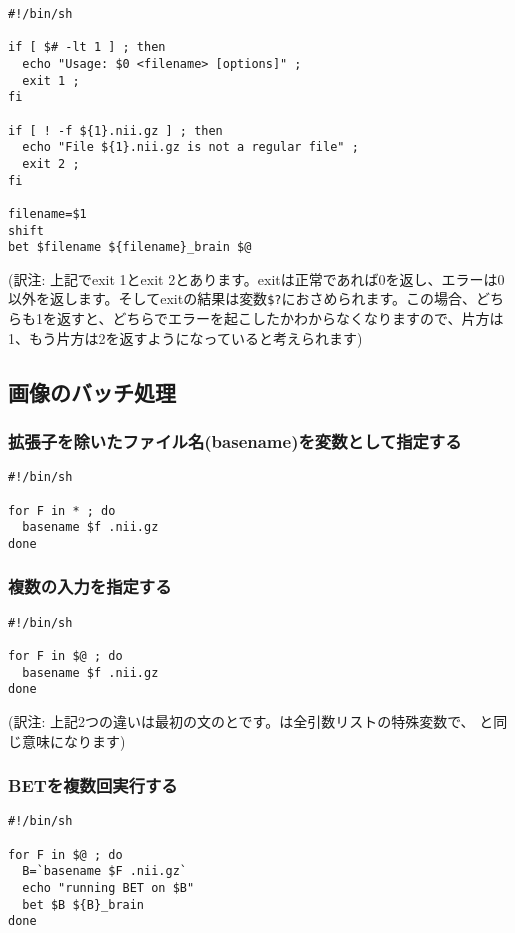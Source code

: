 \documentclass{jsarticle}
\begin{document}
\begin{verbatim}
#!/bin/sh

if [ $# -lt 1 ] ; then
  echo "Usage: $0 <filename> [options]" ;
  exit 1 ;
fi

if [ ! -f ${1}.nii.gz ] ; then
  echo "File ${1}.nii.gz is not a regular file" ;
  exit 2 ;
fi

filename=$1
shift
bet $filename ${filename}_brain $@
\end{verbatim}

\noindent (訳注: 上記でexit 1とexit 2とあります。exitは正常であれば0を返し、エラーは0以外を返します。そしてexitの結果は変数{\tt \$?}におさめられます。この場合、どちらも1を返すと、どちらでエラーを起こしたかわからなくなりますので、片方は1、もう片方は2を返すようになっていると考えられます)

\subsection{画像のバッチ処理}

\subsubsection{拡張子を除いたファイル名(basename)を変数として指定する}

\begin{verbatim}
#!/bin/sh

for F in * ; do
  basename $f .nii.gz
done
\end{verbatim}

\subsubsection{複数の入力を指定する}

\begin{verbatim}
#!/bin/sh

for F in $@ ; do
  basename $f .nii.gz
done
\end{verbatim}

\noindent (訳注: 上記2つの違いは最初の文の{\color{red}\Q{*}}と{\color{red}{\tt \$@}}です。{\color{red}{\tt \$@}}は全引数リストの特殊変数で、{\color{red}{\tt \$1 \$2 … \$n}} と同じ意味になります)

\subsubsection{BETを複数回実行する}

\begin{verbatim}
#!/bin/sh

for F in $@ ; do  
  B=`basename $F .nii.gz`
  echo "running BET on $B"
  bet $B ${B}_brain
done
\end{verbatim}
\end{document}
